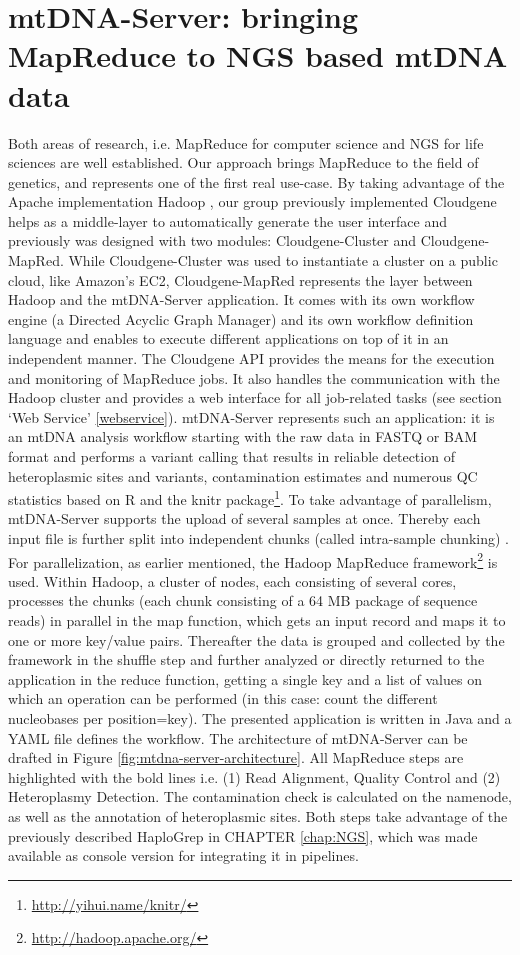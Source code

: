 \section{mtDNA-Server: bringing MapReduce to NGS based mtDNA data}
Both areas of research, i.e. MapReduce for computer science and NGS for life sciences are well established. Our approach brings MapReduce to the field of genetics, and represents one of the first real use-case. By taking advantage of the Apache implementation Hadoop \cite{White2009}, our group previously implemented Cloudgene \cite{Schonherr2012} helps as a middle-layer to automatically generate the user interface and previously was designed with two modules: Cloudgene-Cluster and Cloudgene-MapRed. While Cloudgene-Cluster was used to instantiate a cluster on a public cloud, like Amazon's EC2, Cloudgene-MapRed represents the layer between Hadoop and the mtDNA-Server application. It comes with its own workflow engine (a Directed Acyclic Graph Manager) and its own workflow definition language and enables to execute different applications on top of it in an independent manner. The Cloudgene API provides the means for the execution and monitoring of MapReduce jobs. It also handles the communication with the Hadoop cluster and provides a web interface for all job-related tasks  \cite{Weissensteiner2016b} (see section ‘Web Service’ \ref{webservice}).
mtDNA-Server represents such an application: it is an mtDNA analysis workflow starting with the raw data in FASTQ or BAM format and performs a variant calling that results in reliable detection of heteroplasmic sites and variants, contamination estimates and numerous QC statistics based on R \cite{R} and the knitr package\footnote{\url{http://yihui.name/knitr/}}. To take advantage of parallelism, mtDNA-Server supports the upload of several samples at once. Thereby each input file is further split into independent chunks (called intra-sample chunking) \cite{Weissensteiner2016b}. For parallelization, as earlier mentioned, the Hadoop MapReduce framework\footnote{\url{http://hadoop.apache.org/}} is used. Within Hadoop, a cluster of nodes, each consisting of several cores, processes the chunks (each chunk consisting of a 64 MB package of sequence reads) in parallel in the map function, which gets an input record and maps it to one or more key/value pairs. Thereafter the data is grouped and collected by the framework in the shuffle step and further analyzed or directly returned to the application in the reduce function, getting a single key and a list of values on which an operation can be performed (in this case: count the different nucleobases per position=key). The presented application is written in Java and a YAML file defines the workflow. The architecture of mtDNA-Server can be drafted in Figure \ref{fig:mtdna-server-architecture}. All MapReduce steps are highlighted with the bold lines i.e. (1) Read Alignment, Quality Control and (2) Heteroplasmy Detection. The contamination check is calculated on the namenode, as well as the annotation of heteroplasmic sites. Both steps take advantage of the previously described HaploGrep in CHAPTER \ref{chap:NGS}, which was made available as console version for integrating it in pipelines. 
